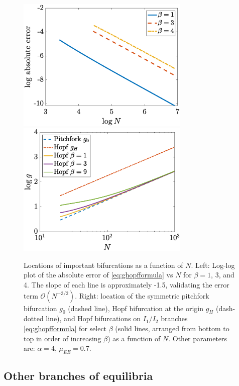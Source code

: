 \documentclass[reqno]{siamonline190516}
\begin{document}
\begin{figure}
    \centering
    \includegraphics[width=8.25cm]{Hopfapproxerrorsemilog.eps} \hspace{-0.5cm}
    \includegraphics[width=8.25cm]{HopflogNvsgsemilog.eps}
    \caption{Locations of important bifurcations as a function of $N$. Left: Log-log plot of the absolute error of  \cref{eq:ghopfformula} vs $N$ for $\beta = 1$, 3, and 4. The slope of each line is approximately -1.5, validating the error term $\mathcal{O}\left( N^{-3/2} \right)$. Right: location of the symmetric pitchfork bifurcation $g_0$ (dashed line), Hopf bifurcation at the origin $g_H$ (dash-dotted line), and Hopf bifurcations on $I_1/I_2$ branches \cref{eq:ghopfformula} for select $\beta$ (solid lines, arranged from bottom to top in order of increasing $\beta$) as a function of $N$. Other parameters are: $\alpha = 4$, $\mu_{EE}= 0.7$. }
    \label{fig:Hopfplots}
\end{figure}

\subsection{Other branches of equilibria}\label{sec:otherbranches}
\end{document}

